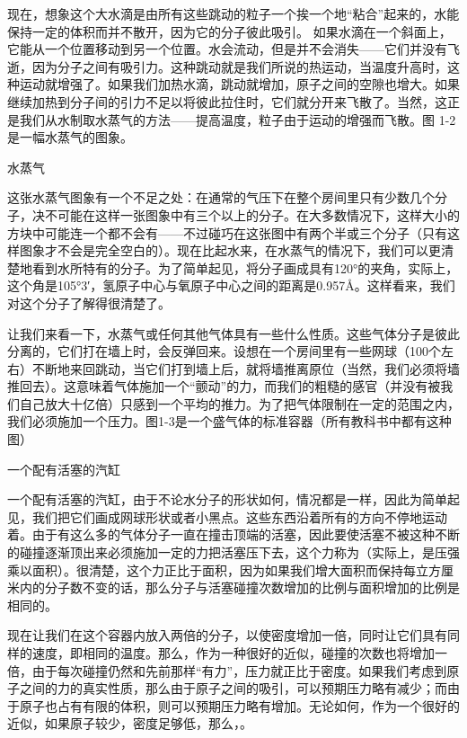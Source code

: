 \documentclass[12pt,oneside]{book}
\begin{document}
现在，想象这个大水滴是由所有这些跳动的粒子一个挨一个地“粘合”起来的，水能保持一定的体积而并不散开，因为它的分子彼此吸引。 如果水滴在一个斜面上，它能从一个位置移动到另一个位置。水会流动，但是并不会消失——它们并没有飞逝，因为分子之间有吸引力。这种跳动就是我们所说的热运动，当温度升高时，这种运动就增强了。如果我们加热水滴，跳动就增加，原子之间的空隙也增大。如果继续加热到分子间的引力不足以将彼此拉住时，它们就分开来飞散了。当然，这正是我们从水制取水蒸气的方法——提高温度，粒子由于运动的增强而飞散。图 1-2是一幅水蒸气的图象。
\begin{fig}{水蒸气}
\caption{水蒸气}
\label{fig:水蒸气}
\end{fig}
这张水蒸气图象有一个不足之处：在通常的气压下在整个房间里只有少数几个分子，决不可能在这样一张图象中有三个以上的分子。在大多数情况下，这样大小的方块中可能连一个都不会有——不过碰巧在这张图中有两个半或三个分子（只有这样图象才不会是完全空白的）。现在比起水来，在水蒸气的情况下，我们可以更清楚地看到水所特有的分子。为了简单起见，将分子画成具有120°的夹角，实际上，这个角是105°3′，氢原子中心与氧原子中心之间的距离是0.957Å。这样看来，我们对这个分子了解得很清楚了。

让我们来看一下，水蒸气或任何其他气体具有一些什么性质。这些气体分子是彼此分离的，它们打在墙上时，会反弹回来。设想在一个房间里有一些网球（100个左右）不断地来回跳动，当它们打到墙上后，就将墙推离原位（当然，我们必须将墙推回去）。这意味着气体施加一个“颤动”的力，而我们的粗糙的感官（并没有被我们自己放大十亿倍）只感到一个平均的推力。为了把气体限制在一定的范围之内，我们必须施加一个压力。图1-3是一个盛气体的标准容器（所有教科书中都有这种图）
\begin{fig}{一个配有活塞的汽缸}
\caption{一个配有活塞的汽缸}
\label{fig:一个配有活塞的汽缸}
\end{fig}
一个配有活塞的汽缸，由于不论水分子的形状如何，情况都是一样，因此为简单起见，我们把它们画成网球形状或者小黑点。这些东西沿着所有的方向不停地运动着。由于有这么多的气体分子一直在撞击顶端的活塞，因此要使活塞不被这种不断的碰撞逐渐顶出来必须施加一定的力把活塞压下去，这个力称为（实际上，是压强乘以面积）。很清楚，这个力正比于面积，因为如果我们增大面积而保持每立方厘米内的分子数不变的话，那么分子与活塞碰撞次数增加的比例与面积增加的比例是相同的。

现在让我们在这个容器内放入两倍的分子，以使密度增加一倍，同时让它们具有同样的速度，即相同的温度。那么，作为一种很好的近似，碰撞的次数也将增加一倍，由于每次碰撞仍然和先前那样“有力”，压力就正比于密度。如果我们考虑到原子之间的力的真实性质，那么由于原子之间的吸引，可以预期压力略有减少；而由于原子也占有有限的体积，则可以预期压力略有增加。无论如何，作为一个很好的近似，如果原子较少，密度足够低，那么，。
\end{document}
